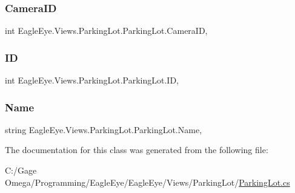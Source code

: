 \subsubsection{\texorpdfstring{CameraID}{CameraID}}
{\footnotesize\ttfamily int Eagle\+Eye.\+Views.\+Parking\+Lot.\+Parking\+Lot.\+Camera\+ID\hspace{0.3cm}{\ttfamily [get]}, {\ttfamily [set]}}

\mbox{\label{class_eagle_eye_1_1_views_1_1_parking_lot_1_1_parking_lot_a577b278535b3599ca2aeb7ad17232f76}} 
\subsubsection{\texorpdfstring{ID}{ID}}
{\footnotesize\ttfamily int Eagle\+Eye.\+Views.\+Parking\+Lot.\+Parking\+Lot.\+ID\hspace{0.3cm}{\ttfamily [get]}, {\ttfamily [set]}}

\mbox{\label{class_eagle_eye_1_1_views_1_1_parking_lot_1_1_parking_lot_afad744515e8684f99befb40034fda405}} 
\subsubsection{\texorpdfstring{Name}{Name}}
{\footnotesize\ttfamily string Eagle\+Eye.\+Views.\+Parking\+Lot.\+Parking\+Lot.\+Name\hspace{0.3cm}{\ttfamily [get]}, {\ttfamily [set]}}



The documentation for this class was generated from the following file\+:\begin{DoxyCompactItemize}
\item 
C\+:/\+Gage Omega/\+Programming/\+Eagle\+Eye/\+Eagle\+Eye/\+Views/\+Parking\+Lot/\mbox{\hyperlink{_views_2_parking_lot_2_parking_lot_8cs}{Parking\+Lot.\+cs}}\end{DoxyCompactItemize}
